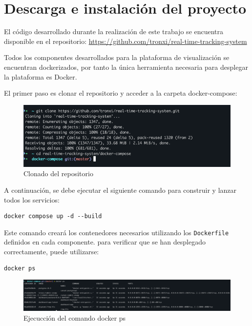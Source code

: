 \chapter{Descarga e instalación del proyecto}
\label{Appendix:Key1}

El código desarrollado durante la realización de este trabajo se encuentra disponible en el
repositorio: \url{https://github.com/tronxi/real-time-tracking-system}

Todos los componentes desarrollados para la plataforma de visualización se encuentran dockerizados, por tanto la única herramienta necesaria para desplegar la plataforma es Docker.

El primer paso es clonar el repositorio y acceder a la carpeta docker-compose:

\begin{figure}[H]
    \centering
    \includegraphics[width=1\textwidth]{Imagenes/Bitmap/clone}
    \caption{Clonado del repositorio}
    \label{fig:clone}
\end{figure}

A continuación, se debe ejecutar el siguiente comando para construir y lanzar todos los servicios:

\begin{verbatim}
docker compose up -d --build
\end{verbatim}

Este comando creará los contenedores necesarios utilizando los \texttt{Dockerfile} definidos en cada componente.
para verificar que se han desplegado correctamente, puede utilizarse:

\begin{verbatim}
docker ps
\end{verbatim}

\begin{figure}[H]
    \centering
    \includegraphics[width=1\textwidth]{Imagenes/Bitmap/ps}
    \caption{Ejecucción del comando docker ps}
    \label{fig:ps}
\end{figure}

